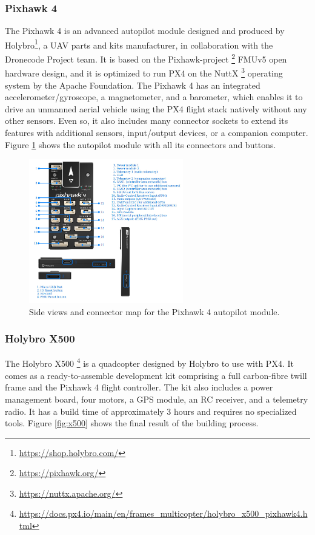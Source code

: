 \subsubsection{Pixhawk 4}
\label{subsec:pixhawk}
The Pixhawk 4 is an advanced autopilot module designed and produced by Holybro\footnote{\url{https://shop.holybro.com/}}, a UAV parts and kits manufacturer, in collaboration with the Dronecode Project team.
It is based on the Pixhawk-project \footnote{\url{https://pixhawk.org/}} FMUv5 open hardware design, and it is optimized to run PX4 on the NuttX \footnote{\url{https://nuttx.apache.org/}} operating system by the Apache Foundation.
The Pixhawk 4 has an integrated accelerometer/gyroscope, a magnetometer, and a barometer, which enables it to drive an unmanned aerial vehicle using the PX4 flight stack natively without any other sensors.
Even so, it also includes many connector sockets to extend its features with additional sensors, input/output devices, or a companion computer.
Figure \ref{fig:pixhawk4} shows the autopilot module with all its connectors and buttons.

\begin{figure}
  \centering
  \includegraphics[width=0.6\textwidth,keepaspectratio]{img/pixhawk4.jpg}
  \caption{Side views and connector map for the Pixhawk 4 autopilot module.}
  \label{fig:pixhawk4}
\end{figure}


\subsubsection{Holybro X500}
\label{subsec:x500}
The Holybro X500 \footnote{\url{https://docs.px4.io/main/en/frames_multicopter/holybro_x500_pixhawk4.html}} is a quadcopter designed by Holybro to use with PX4.
It comes as a ready-to-assemble development kit comprising a full carbon-fibre twill frame and the Pixhawk 4 flight controller.
The kit also includes a power management board, four motors, a GPS module, an RC receiver, and a telemetry radio.
It has a build time of approximately 3 hours and requires no specialized tools.
Figure \ref{fig:x500} shows the final result of the building process.

